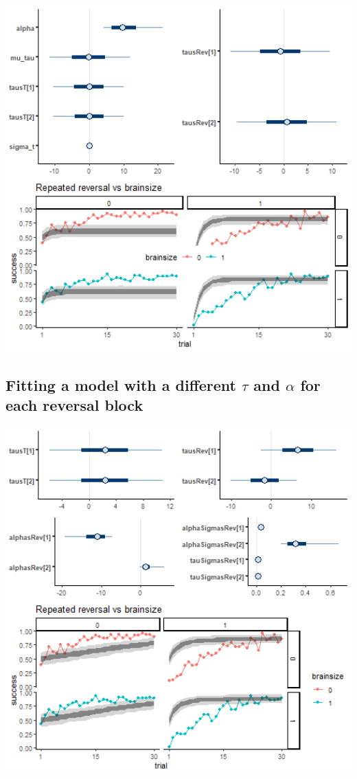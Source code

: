 \documentclass[
]{article}
\begin{document}
\begin{flushleft}\includegraphics[width=6.67in,]{images/boussard_short_01_tau} \end{flushleft}

\hypertarget{fitting-a-model-with-a-different-tau-and-alpha-for-each-reversal-block}{%
\subsection{\texorpdfstring{Fitting a model with a different \(\tau\)
and \(\alpha\) for each reversal
block}{Fitting a model with a different \textbackslash tau and \textbackslash alpha for each reversal block}}\label{fitting-a-model-with-a-different-tau-and-alpha-for-each-reversal-block}}

\begin{flushleft}\includegraphics[width=6.67in,]{images/Boussard_short_alpha_tau_sigma} \end{flushleft}
\end{document}
